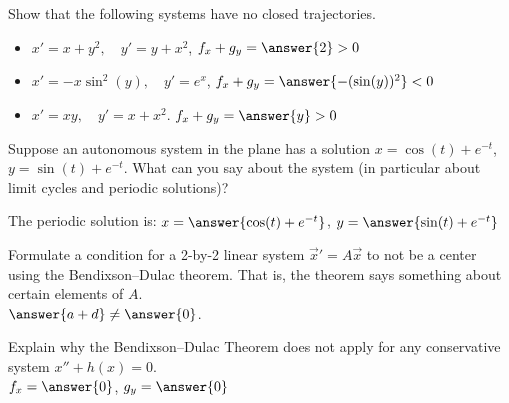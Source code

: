 \documentclass{ximera}
\begin{document}
\begin{exercise}%
    Show that the following systems have no closed trajectories.
    \begin{itemize}
        \item $x'=x+y^2,\quad y'=y+x^2$, $f_x + g_y = \answer{2} > 0$
        \item $x'=-x\sin^2(y),\quad y'=e^x$, $f_x+g_y = \answer{-(\sin(y))^2} < 0$
        \item $x'=xy,\quad y'=x+x^2$. $f_x + g_y = \answer{y} > 0$
    \end{itemize}
\end{exercise}

\begin{exercise}%
    Suppose an autonomous system in the plane has a solution $x=\cos(t)+e^{-t}$, $y=\sin(t)+e^{-t}$.  What can you say about the system (in particular about limit cycles and periodic solutions)?
    \begin{multipleChoice}
    \end{multipleChoice}
    \begin{problem}
        The periodic solution is: $x = \answer{\cos(t)+e^{-t}}$, $y= \answer{\sin(t)+e^{-t}}$
    \end{problem}
\end{exercise}

\begin{exercise}
    Formulate a condition for a 2-by-2 linear system ${\vec{x}}' = A \vec{x}$ to not be a center using the Bendixson--Dulac theorem. That is, the theorem says something about certain elements of $A$.\\
    $\answer{a+d} \neq \answer{0}$.
\end{exercise}

\begin{exercise}
    Explain why the Bendixson--Dulac Theorem does not apply for any conservative system $x''+h(x) = 0$.\\
    $f_x = \answer{0}$, $g_y = \answer{0}$
\end{exercise}
\end{document}
